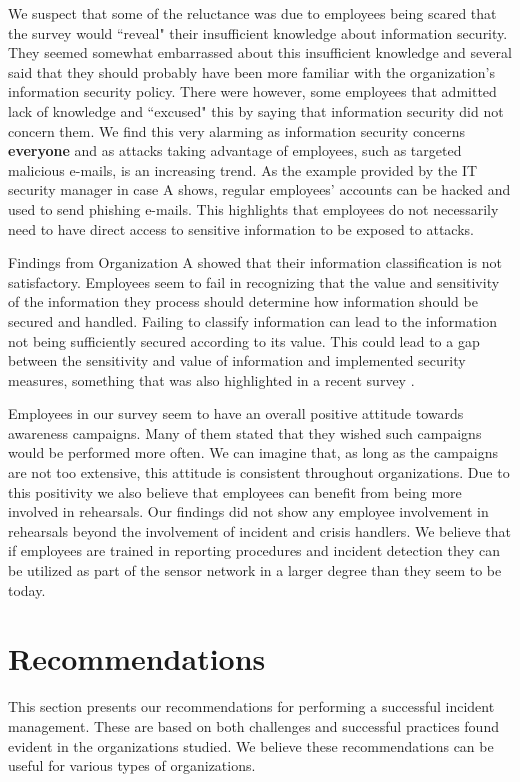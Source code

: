 We suspect that some of the reluctance was due to employees being scared that the survey would ``reveal" their insufficient knowledge about information security. They seemed somewhat embarrassed about this insufficient knowledge and several said that they should probably have been more familiar with the organization's information security policy. There were however, some employees that admitted lack of knowledge and ``excused" this by saying that information security did not concern them. We find this very alarming as information security concerns \textbf{everyone} and as attacks taking advantage of employees, such as targeted malicious e-mails, is an increasing trend. As the example provided by the IT security manager in case A shows, regular employees' accounts can be hacked and used to send phishing e-mails. This highlights that employees do not necessarily need to have direct access to sensitive information to be exposed to attacks.  

Findings from Organization A showed that their information classification is not satisfactory. Employees seem to fail in recognizing that the value and sensitivity of the information they process should determine how information should be secured and handled. Failing to classify information can lead to the information not being sufficiently secured according to its value. This could lead to a gap between the sensitivity and value of information and implemented security measures, something that was also highlighted in a recent survey \cite{Morketall2012}.

Employees in our survey seem to have an overall positive attitude towards awareness campaigns. Many of them stated that they wished such campaigns would be performed more often. We can imagine that, as long as the campaigns are not too extensive, this attitude is consistent throughout organizations. Due to this positivity we also believe that employees can benefit from being more involved in rehearsals. Our findings did not show any employee involvement in rehearsals beyond the involvement of incident and crisis handlers. We believe that if employees are trained in reporting procedures and incident detection they can be utilized as part of the sensor network in a larger degree than they seem to be today. 

\section{Recommendations}
\label{sec:rec}
This section presents our recommendations for performing a successful incident management. These are based on both challenges and successful practices found evident in the organizations studied. We believe these recommendations can be useful for various types of organizations.

